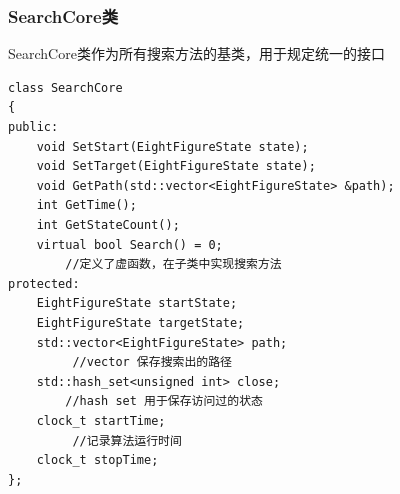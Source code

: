 \documentclass[12pt,a4paper]{article}
\begin{document}
\subsubsection{SearchCore类}
SearchCore类作为所有搜索方法的基类，用于规定统一的接口
\begin{lstlisting}
class SearchCore
{
public:
    void SetStart(EightFigureState state);
    void SetTarget(EightFigureState state);
    void GetPath(std::vector<EightFigureState> &path);
    int GetTime();
    int GetStateCount();
    virtual bool Search() = 0;			
    	//定义了虚函数，在子类中实现搜索方法
protected:
    EightFigureState startState;
    EightFigureState targetState;
    std::vector<EightFigureState> path;		
   		 //vector 保存搜索出的路径
    std::hash_set<unsigned int> close;			
    	//hash set 用于保存访问过的状态
    clock_t startTime;									
   		 //记录算法运行时间
    clock_t stopTime;
};
\end{lstlisting}
\end{document}
